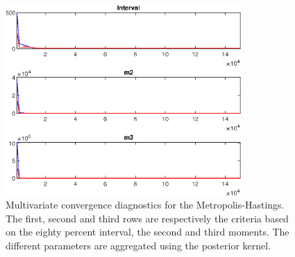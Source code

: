  
\begin{figure}[H]
\centering 
\includegraphics[width=0.8\textwidth]{BRS_growth_res/Output/BRS_growth_res_mdiag}
\caption{Multivariate convergence diagnostics for the Metropolis-Hastings.
The first, second and third rows are respectively the criteria based on
the eighty percent interval, the second and third moments. The different 
parameters are aggregated using the posterior kernel.}\label{Fig:MultivariateDiagnostics}
\end{figure}

